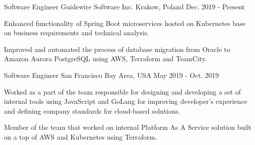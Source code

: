 

\begin{cventries}

  \cventry
    {Software Engineer} %
    {Guidewire Software Inc.} %
    {Krakow, Poland} %
    {Dec. 2019 - Present} %
    {
      \begin{cvitems} %
       \item {Enhanced functionality of Spring Boot microservices hosted on Kubernetes base on business requirements and technical analysis.}
        \item {Improved and automated the process of database migration from Oracle to Amazon Aurora PostgreSQL using AWS, Terraform and TeamCity.}
      \end{cvitems}
    }

  \cventry
    {Software Engineer} %
    {} %
    {San Francisco Bay Area, USA} %
    {May 2019 - Oct. 2019} %
    {
      \begin{cvitems} %
        \item {Worked as a part of the team responsible for designing and developing a set of internal tools using JavaScript and GoLang for improving developer's experience and defining company standards for cloud-based solutions.}
        \item {Member of the team that worked on internal Platform As A Service solution built on a top of AWS and Kubernetes using Terraform. }
      \end{cvitems}
    }


\end{cventries}
